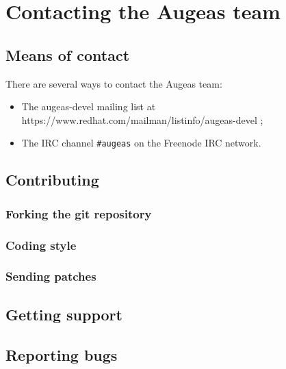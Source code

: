 \chapter{Contacting the Augeas team}

\section{Means of contact}

There are several ways to contact the Augeas team:

\begin{itemize}
\item
  The augeas-devel mailing list at https://www.redhat.com/mailman/listinfo/augeas-devel ;
\item
  The IRC channel \verb!#augeas! on the Freenode IRC network.
\end{itemize}
\section{Contributing}

\subsection{Forking the git repository}

\subsection{Coding style}

\subsection{Sending patches}

\section{Getting support}

\section{Reporting bugs}


